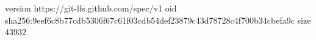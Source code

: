 version https://git-lfs.github.com/spec/v1
oid sha256:9eef6c8b77cdb5306f67c61f03cdb54def23879c43d78728c4f700b34cbefa9c
size 43932
